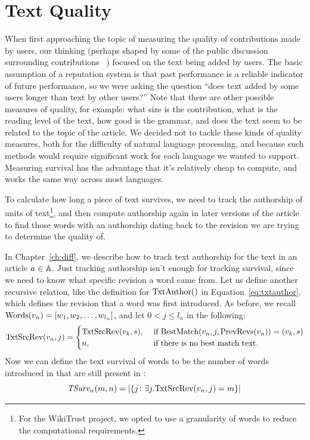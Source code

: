 \section{Text Quality}
\label{sec:textquality}

When first approaching the topic of measuring the quality
of contributions made by users, our thinking (perhaps shaped
by some of the public discussion surrounding
contributions~\cite{Swartz2006} )
focused on the text being added by users.
The basic assumption of a reputation system is that past performance
is a reliable indicator of future performance, so we were
asking the question ``does text added by some users 
longer than text by other users?''
Note that there are other possible measures of quality, for example:
what size is the contribution, what is the reading level of the text,
how good is the grammar, and does the text seem to be related to
the topic of the article.
We decided not to tackle these kinds of quality measures, both for
the difficulty of natural language processing, and because such
methods would require significant work for each language we wanted
to support.
Measuring survival has the advantage that it's relatively cheap to
compute, and works the same way across most languages.

To calculate how long a piece of text survives,
we need to track the authorship of
units of text\footnote{For the WikiTrust project, we opted to
use a granularity of words to reduce the computational requirements.},
and then compute authorship again in later
versions of the article to find those words with an
authorship dating back to the revision we are trying
to determine the quality of.

In Chapter~\ref{ch:diff}, we describe how to track text authorship
for the text in an article $a_{} \in \mathbb{A}$.
Just tracking authorship isn't enough for tracking survival, since
we need to know what specific revision a word came from.
Let us define another recursive relation, like the definition
for $\mathrm{TxtAuthor}()$ in Equation~\ref{eq:txtauthor},
which defines the revision that a word was first introduced.
As before, we recall
$\mathrm{Words}(v_{n}) = \left[ w_1, w_2, \ldots, w_{l_n} \right]$, and let $0 < j \le l_n$ in the following:
\begin{equation*}
\mathrm{TxtSrcRev}(v_{n}, j) =
    \begin{cases}
        \mathrm{TxtSrcRev}(v_{k}, s), & \text{ if }
        \mathrm{BestMatch}(v_{n}, j, \mathrm{PrevRevs}(v_{n})) = (v_{k}, s) \\
        n, & \text{ if there is no best match text. } \\
    \end{cases}
\end{equation*}
Now we can define the text survival of words to be the number of
words introduced in  that are still present in :
\begin{equation}
\tsurv{\article{}}{m,n} = \left| \left\{ j \colon
    \exists j . \txtsrcrev{\version{n},j} = m \right\} \right| \\
\label{eq:tsurv}
\end{equation}

